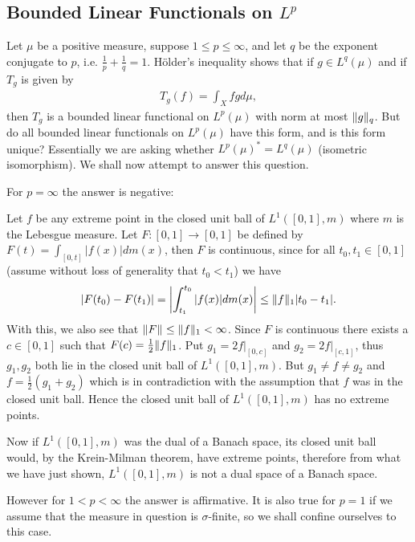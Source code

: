 \documentclass[../../main.tex]{subfiles}
\begin{document}
\subsection{Bounded Linear Functionals on $L^{p}$}
Let $\mu$ be a positive measure, suppose $1\le p \le \infty$, and let $q$ be the exponent conjugate to $p$, i.e. $\frac{1}{p}+\frac{1}{q}=1$. Hölder's inequality shows that if $g\in L^{q}(\mu)$ and if $T_{g}$ is given by
\begin{align*}
	T_{g}(f)=\int_{X}fgd\mu,
\end{align*}
then $T_{g}$ is a bounded linear functional on $L^{p}(\mu)$ with norm at most $\norm[q]{g}$. But do all bounded linear functionals on $L^{p}(\mu)$ have this form, and is this form unique? Essentially we are asking whether $L^{p}(\mu)^{*}=L^{q}(\mu)$ (isometric isomorphism). We shall now attempt to answer this question.

For $p=\infty$ the answer is negative: 

Let $f$ be any extreme point in the closed unit ball of $L^{1}([0,1], m)$ where $m$ is the Lebesgue measure. Let $F:[0,1] \to [0,1]$ be defined by $F(t)=\int_{[0,t]}|f(x)|dm(x)$, then $F$ is continuous, since for all $t_{0},t_{1}\in [0,1]$ (assume without loss of generality that $t_{0}<t_{1}$) we have
\begin{align*}
	|F(t_{0})-F(t_{1})|=\left| \int_{t_{1}}^{t_{0}}|f(x)|dm(x) \right| \le \norm[1]{f}|t_{0}-t_{1}|.
\end{align*}
With this, we also see that $\norm{F}\le\norm[1]{f}<\infty$. Since $F$ is continuous there exists a $c\in [0,1]$ such that $F(c)=\frac{1}{2}\norm[1]{f}$.
Put $g_{1}=2f|_{[0,c]}$ and $g_{2}=2f|_{[c,1]}$, thus $g_{1},g_{2}$ both lie in the closed unit ball of $L^{1}([0,1],m)$. But $g_{1}\neq f \neq g_{2}$ and $f=\frac{1}{2}(g_{1}+g_{2})$ which is in contradiction with the assumption that $f$ was in the closed unit ball. Hence the closed unit ball of $L^{1}([0,1], m)$ has no extreme points.

Now if $L^{1}([0,1],m)$ was the dual of a Banach space, its closed unit ball would, by the Krein-Milman theorem, have extreme points, therefore from what we have just shown, $L^{1}([0,1], m)$ is not a dual space of a Banach space.

However for $1<p<\infty$ the answer is affirmative. It is also true for $p=1$ if we assume that the measure in question is $\sigma$-finite, so we shall confine ourselves to this case.
\end{document}
